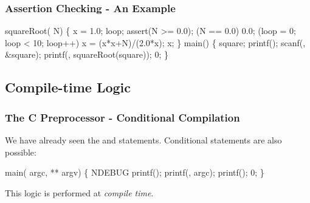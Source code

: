 \documentclass[smaller,table]{beamer}
\begin{document}
\begin{frame}[fragile]
\frametitle{Assertion Checking - An Example}
\vspace{-0.2in}
\begin{semiverbatim}
\scriptsize
\kr\kl{} 
\kl{} 
\kl{}
\kl{} squareRoot( N)
\kl\{
\kl   {} x = 1.0;
\kl   {} loop;
\kl   {}
\kl   assert(N >= 0.0);
\kl   {} (N == 0.0)  0.0;
\kl   {} (loop = 0; loop < 10; loop++)
\kl      x = (x*x+N)/(2.0*x);
\kl   {} x;
\kl\}
\kl
\kl{} main()
\kl\{
\kl   {} square;
\kl   printf();
\kl   scanf(, \&square);
\kl   {}
\kl   printf(, squareRoot(square));
\kl   {} 0;
\kl\}
\end{semiverbatim}
\end{frame}

\subsection{Compile-time Logic}
\begin{frame}[fragile]
\frametitle{The C Preprocessor - Conditional Compilation}
We have already seen the {\tt {}} and {\tt {}} statements. Conditional statements are also possible:
\vspace{-0.2in}
\begin{semiverbatim}
\small
\kr\kl{} 
\kl
\kl{} main( argc,  ** argv)
\kl\{
\kl{} NDEBUG
\kl   printf();
\kl   printf(, argc);
\kl{}
\kl   printf();
\kl{}
\kl   {} 0;
\kl\}
\end{semiverbatim}
\begin{alertblock}{}
This logic is performed at \emph{compile time}.
\end{alertblock}
\end{frame}
\end{document}
